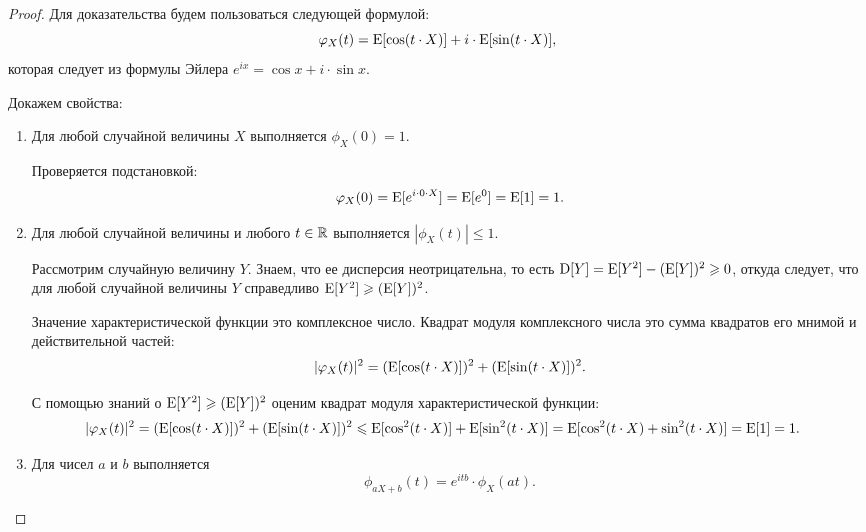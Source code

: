 \begin{proof}
    Для доказательства будем пользоваться следующей формулой:
    \begin{equation*}
        \varphi_X(t) = \operatorname{E}[\cos (t \cdot X)] + i \cdot \operatorname{E}[\sin (t \cdot X)],
    \end{equation*}
    которая следует из формулы Эйлера $e^{ix} = \cos x + i \cdot \sin x$.

    Докажем свойства:
    \begin{enumerate}
    \item
        Для любой случайной величины $X$ выполняется $\phi_X(0) = 1$.

        Проверяется подстановкой:
        \begin{equation*}
            \varphi_X(0) = \operatorname{E}[e^{i \cdot 0 \cdot X}] = \operatorname{E}[e^0] = \operatorname{E}[1] = 1.
        \end{equation*}
        
    \item 
        Для любой случайной величины и любого $t \in \mathbb{R}$ выполняется $|\phi_X(t)| \leq 1$.

        Рассмотрим случайную величину $Y$. Знаем, что ее дисперсия неотрицательна, то есть $\operatorname{D}[Y] = \operatorname{E}[Y^2] - (\operatorname{E}[Y])^2 \geqslant 0$, откуда следует, что для любой случайной величины $Y$ справедливо $\operatorname{E}[Y^2] \geqslant (\operatorname{E}[Y])^2$.

        Значение характеристической функции это комплексное число. Квадрат модуля комплексного числа это сумма квадратов его мнимой и действительной частей:
        \begin{equation*}
            |\varphi_X(t)|^2 = (\operatorname{E}[\cos (t \cdot X)])^2 + (\operatorname{E}[\sin (t \cdot X)])^2.
        \end{equation*}
        
        
        С помощью знаний о $\operatorname{E}[Y^2] \geqslant (\operatorname{E}[Y])^2$ оценим квадрат модуля характеристической функции:
        \begin{align*}
            |\varphi_X(t)|^2 
            &= (\operatorname{E}[\cos (t \cdot X)])^2 + (\operatorname{E}[\sin (t \cdot X)])^2
            \leqslant \operatorname{E}[\cos^2(t \cdot X)] + \operatorname{E}[\sin^2 (t \cdot X)]
            = \operatorname{E}[\cos^2 (t \cdot X) + \sin^2 (t \cdot X)]
            = \operatorname{E}[1]
            = 1.
        \end{align*}    

    \item 
        Для чисел $a$ и $b$ выполняется
        \begin{equation*}
            \phi_{aX + b}(t) = e^{itb} \cdot \phi_X(at).
        \end{equation*}


\end{enumerate}
\end{proof}
